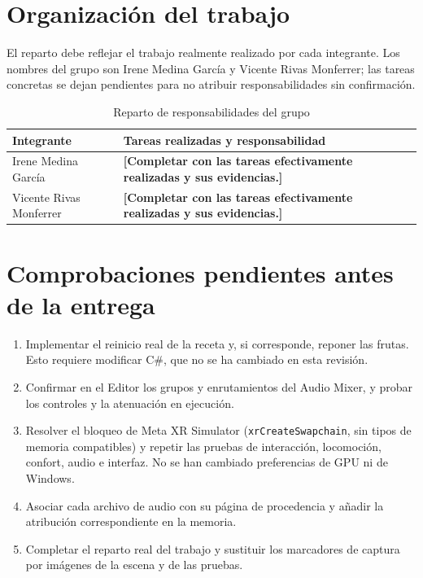 \documentclass[11pt,a4paper]{article}
\begin{document}
\section{Organización del trabajo}

El reparto debe reflejar el trabajo realmente realizado por cada integrante.
Los nombres del grupo son Irene Medina García y Vicente Rivas Monferrer; las
tareas concretas se dejan pendientes para no atribuir responsabilidades sin
confirmación.

\begin{table}[H]
\centering
\begin{tabularx}{\textwidth}{>{\raggedright\arraybackslash}p{}X}
\toprule
\textbf{Integrante} & \textbf{Tareas realizadas y responsabilidad}\\
\midrule
Irene Medina García & \textbf{[Completar con las tareas efectivamente
realizadas y sus evidencias.]}\\
Vicente Rivas Monferrer & \textbf{[Completar con las tareas efectivamente
realizadas y sus evidencias.]}\\
\bottomrule
\end{tabularx}
\caption{Reparto de responsabilidades del grupo}
\end{table}

\section{Comprobaciones pendientes antes de la entrega}

\begin{enumerate}
  \item Implementar el reinicio real de la receta y, si corresponde, reponer las
        frutas. Esto requiere modificar C\#, que no se ha cambiado en esta
        revisión.
  \item Confirmar en el Editor los grupos y enrutamientos del Audio Mixer, y
        probar los controles y la atenuación en ejecución.
  \item Resolver el bloqueo de Meta XR Simulator (\texttt{xrCreateSwapchain},
        sin tipos de memoria compatibles) y repetir las pruebas de interacción,
        locomoción, confort, audio e interfaz. No se han cambiado preferencias
        de GPU ni de Windows.
  \item Asociar cada archivo de audio con su página de procedencia y añadir la
        atribución correspondiente en la memoria.
  \item Completar el reparto real del trabajo y sustituir los marcadores de
        captura por imágenes de la escena y de las pruebas.
\end{enumerate}
\end{document}
